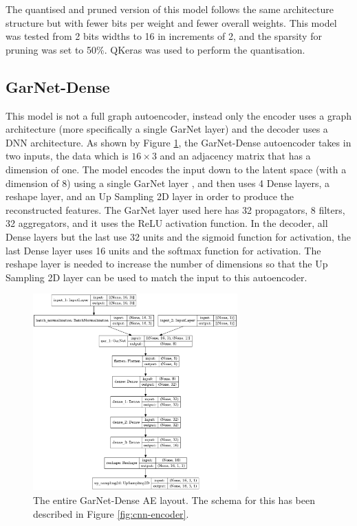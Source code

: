 \documentclass[a4paper]{article}
\theoremstyle{plain}
\theoremstyle{definition}
\begin{document}
            The quantised and pruned version of this model follows the same architecture structure but with fewer bits per weight and fewer overall weights. This model was tested from 2 bits widths to 16 in increments of 2, and the sparsity for pruning was set to 50\%. QKeras \cite{qkeras} was used to perform the quantisation. 

        \subsection{GarNet-Dense}

            This model is not a full graph autoencoder, instead only the encoder uses a graph architecture (more specifically a single GarNet layer) and the decoder uses a DNN architecture. As shown by Figure \ref{fig:garnet-model}, the GarNet-Dense autoencoder takes in two inputs, the data which is $16 \times 3$ and an adjacency matrix that has a dimension of one. The model encodes the input down to the latent space (with a dimension of 8) using a single GarNet layer \cite{garnet}, and then uses 4 Dense layers, a reshape layer, and an Up Sampling 2D layer in order to produce the reconstructed features. The GarNet layer used here has 32 propagators, 8 filters, 32 aggregators, and it uses the ReLU activation function. In the decoder, all Dense layers but the last use 32 units and the sigmoid function for activation, the last Dense layer uses 16 units and the softmax function for activation. The reshape layer is needed to increase the number of dimensions so that the Up Sampling 2D layer can be used to match the input to this autoencoder. 
                
            \begin{figure}[H]
                \centering
                \begin{minipage}[b]{\linewidth}
                    \centering
                    \includegraphics[width=0.7\textwidth]{model.png}
                    \caption{The entire GarNet-Dense AE layout. The schema for this has been described in Figure \ref{fig:cnn-encoder}.}
                    \label{fig:garnet-model}
                \end{minipage}
            \end{figure}
\end{document}
